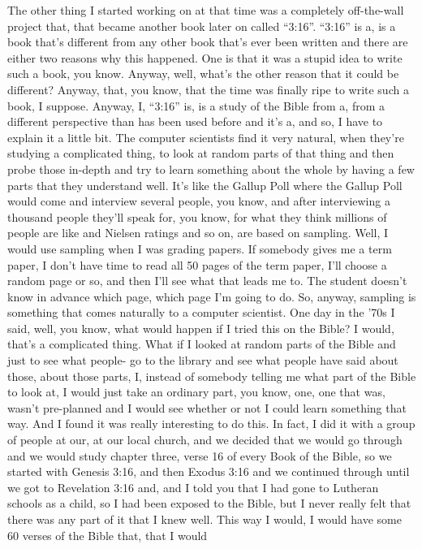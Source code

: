 \documentclass[]{article}
\begin{document}
The other thing I started working on at that time was a completely
off-the-wall project that, that became another book later on called
``3:16''. ``3:16'' is a, is a book that's different from any other book
that's ever been written and there are either two reasons why this
happened. One is that it was a stupid idea to write such a book, you
know. Anyway, well, what's the other reason that it could be different?
Anyway, that, you know, that the time was finally ripe to write such a
book, I suppose. Anyway, I, ``3:16'' is, is a study of the Bible from a,
from a different perspective than has been used before and it's a, and
so, I have to explain it a little bit. The computer scientists find it
very natural, when they're studying a complicated thing, to look at
random parts of that thing and then probe those in-depth and try to
learn something about the whole by having a few parts that they
understand well. It's like the Gallup Poll where the Gallup Poll would
come and interview several people, you know, and after interviewing a
thousand people they'll speak for, you know, for what they think
millions of people are like and Nielsen ratings and so on, are based on
sampling. Well, I would use sampling when I was grading papers. If
somebody gives me a term paper, I don't have time to read all 50 pages
of the term paper, I'll choose a random page or so, and then I'll see
what that leads me to. The student doesn't know in advance which page,
which page I'm going to do. So, anyway, sampling is something that comes
naturally to a computer scientist. One day in the '70s I said, well, you
know, what would happen if I tried this on the Bible? I would, that's a
complicated thing. What if I looked at random parts of the Bible and
just to see what people- go to the library and see what people have said
about those, about those parts, I, instead of somebody telling me what
part of the Bible to look at, I would just take an ordinary part, you
know, one, one that was, wasn't pre-planned and I would see whether or
not I could learn something that way. And I found it was really
interesting to do this. In fact, I did it with a group of people at our,
at our local church, and we decided that we would go through and we
would study chapter three, verse 16 of every Book of the Bible, so we
started with Genesis 3:16, and then Exodus 3:16 and we continued through
until we got to Revelation 3:16 and, and I told you that I had gone to
Lutheran schools as a child, so I had been exposed to the Bible, but I
never really felt that there was any part of it that I knew well. This
way I would, I would have some 60 verses of the Bible that, that I would
\end{document}
